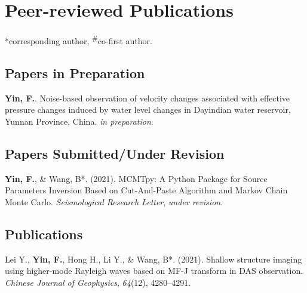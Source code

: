 \section{Peer-reviewed Publications}

\newcommand{\Me}{\textbf{Yin, F.}} %
\newcommand{\Preparation}{\emph{in preparation}}
\newcommand{\Submitted}{\emph{submitted}}
\newcommand{\Revision}{\emph{under revision}}
\newcommand{\CS}{*} %
\newcommand{\CF}{\textsuperscript{\#}} %

\CS corresponding author, \CF co-first author.




\subsection*{Papers in Preparation}
\begin{etaremune}
\item \Me. 
    Noise-based observation of velocity changes associated with eﬀective pressure changes induced by water level changes in Dayindian water reservoir, Yunnan Province, China. 
    \Preparation.
\end{etaremune}




\subsection*{Papers Submitted/Under Revision}
\begin{etaremune}
\item \Me, \& Wang, B\CS. (2021). 
    MCMTpy: A Python Package for Source Parameters Inversion Based on Cut-And-Paste Algorithm and Markov Chain Monte Carlo. 
    \emph{Seismological Research Letter}, \Revision.
\end{etaremune}



\subsection*{Publications}
\begin{etaremune}
\item Lei Y., \Me, Hong H., Li Y., \& Wang, B\CS. (2021). 
    Shallow structure imaging using higher-mode Rayleigh waves based on MF-J transform in DAS observation. 
    \emph{Chinese Journal of Geophysics}, \emph{64}(12), 4280--4291.
\end{etaremune}


